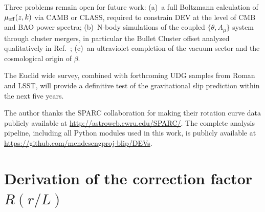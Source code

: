 \documentclass[aps,prd,reprint,floatfix,nofootinbib,superscriptaddress]{revtex4-2}
\begin{document}
Three problems remain open for future work:
(a)~a full Boltzmann calculation of $\mu_{\rm eff}(z,k)$ via
CAMB or CLASS, required to constrain DEV at the level of CMB
and BAO power spectra;
(b)~N-body simulations of the coupled $\{\theta, A_\mu\}$
system through cluster mergers, in particular the Bullet
Cluster offset analyzed qualitatively in
Ref.~\cite{Mendes2026};
(c)~an ultraviolet completion of the vacuum sector and the
cosmological origin of $\beta$.

The Euclid wide survey, combined with forthcoming UDG samples
from Roman and LSST, will provide a definitive test of the
gravitational slip prediction within the next five years.

\begin{acknowledgments}
The author thanks the SPARC collaboration for making their
rotation curve data publicly available at
\url{http://astroweb.cwru.edu/SPARC/}. The complete analysis
pipeline, including all Python modules used in this work, is
publicly available at
\url{https://github.com/mendesengproj-blip/DEVs}.
\end{acknowledgments}

\appendix

\section{Derivation of the correction factor $R(r/L)$}
\label{app:R_derivation}
\end{document}
